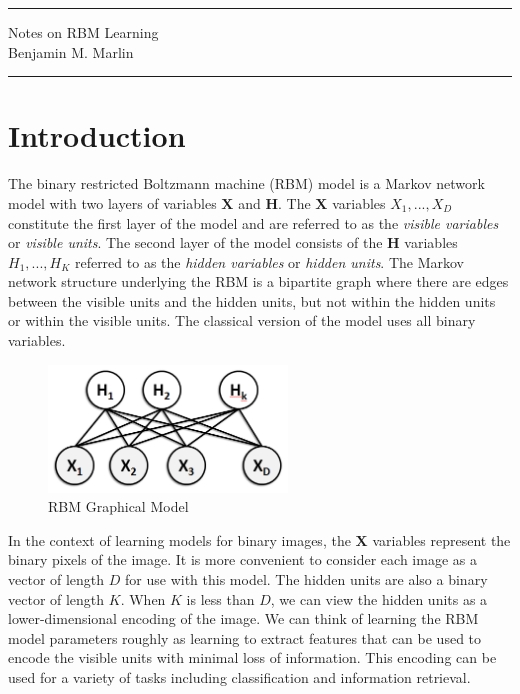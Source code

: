 \documentclass[11pt]{article}
\newcommand{\mbf}[1]{{\mathbf{#1}}}
\begin{document}
{\centering
  \rule{6.3in}{2pt}
  \vspace{1em}
  \Large{Notes on RBM Learning\\}
  Benjamin M. Marlin\\
  \vspace{0.1em}
  \rule{6.3in}{1.5pt}
}
\vspace{1pc}

\section{Introduction}
The binary restricted Boltzmann machine (RBM) model is a Markov network model with two layers of variables $\mbf{X}$ and $\mbf{H}$. The $\mbf{X}$ variables $X_1,...,X_D$ constitute the first layer of the model and are referred to as the \textit{visible variables} or \textit{visible units}. The second layer of the model consists of the $\mbf{H}$ variables $H_1,...,H_K$ referred to as the \textit{hidden variables} or \textit{hidden units}. The Markov network structure underlying the RBM is a bipartite graph where there are edges between the visible units and the hidden units, but not within the hidden units or within the visible units. 
The classical version of the model uses all binary variables.\\

\begin{figure}[ht]
\centering
\includegraphics[width=2.5in]{Figures/rbm.png}
\caption{RBM Graphical Model}
\end{figure}

In the context of learning models for binary images, the $\mbf{X}$ variables represent the binary pixels of the image. It is more convenient to consider each image as a vector of length $D$ for use with this model. The hidden units are also a binary vector of length $K$. When $K$ is less than $D$, we can view the hidden units as a lower-dimensional encoding of the image. We can think of learning the RBM model parameters roughly as learning to extract features that can be used to encode the visible units with minimal loss of information. This encoding can be used for a variety of tasks including classification and information retrieval.\\
\end{document}
